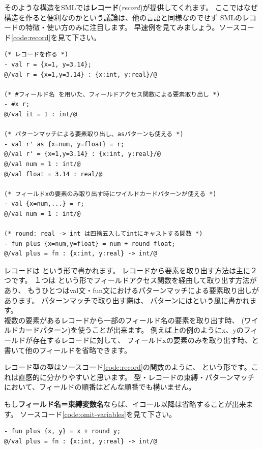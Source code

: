 \documentclass[11pt,a4paper]{article}
\begin{document}
そのような構造をSMLでは\textbf{レコード}(\textit{record})が提供してくれます。
ここではなぜ構造を作ると便利なのかという議論は、他の言語と同様なのでせず
SMLのレコードの特徴・使い方のみに注目します。
早速例を見てみましょう。ソースコード\ref{code:record}を見て下さい。

\begin{lstlisting}[caption=レコードの例,label=code:record]
(* レコードを作る *)
- val r = {x=1, y=3.14};
@/val r = {x=1,y=3.14} : {x:int, y:real}/@

(* #フィールド名 を用いた、フィールドアクセス関数による要素取り出し *)
- #x r;
@/val it = 1 : int/@

(* パターンマッチによる要素取り出し、asパターンも使える *)
- val r' as {x=num, y=float} = r;
@/val r' = {x=1,y=3.14} : {x:int, y:real}/@
@/val num = 1 : int/@
@/val float = 3.14 : real/@

(* フィールドxの要素のみ取り出す時にワイルドカードパターンが使える *)
- val {x=num,...} = r;
@/val num = 1 : int/@

(* round: real -> int は四捨五入してintにキャストする関数 *)
- fun plus {x=num,y=float} = num + round float;
@/val plus = fn : {x:int, y:real} -> int/@
\end{lstlisting}

レコードは
という形で書かれます。
レコードから要素を取り出す方法は主に２つです。
１つは
という形でフィールドアクセス関数を経由して取り出す方法があり、
もうひとつはval文・fun文におけるパターンマッチによる要素取り出しがあります。
パターンマッチで取り出す際は、
パターンにはという風に書かれます。\\
複数の要素があるレコードから一部のフィールド名の要素を取り出す時、
(ワイルドカードパターン)を使うことが出来ます。
例えば上の例のようにx、yのフィールドが存在するレコードに対して、
フィールドxの要素のみを取り出す時、と書いて他のフィールドを省略できます。

レコード型の型はソースコード\ref{code:record}の関数のように、
という形です。これは直感的に分かりやすいと思います。
型・レコードの束縛・パターンマッチにおいて、フィールドの順番はどんな順番でも構いません。

もし\textbf{フィールド名＝束縛変数名}ならば、イコール以降は省略することが出来ます。
ソースコード\ref{code:omit-variables}を見て下さい。

\begin{lstlisting}[caption=レコードのパターンマッチ時の変数名の省略,label=code:omit-variables]
- fun plus {x, y} = x + round y;
@/val plus = fn : {x:int, y:real} -> int/@
\end{lstlisting}
\end{document}
